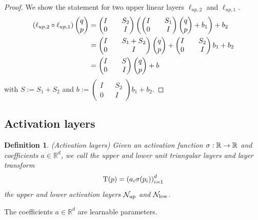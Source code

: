\documentclass[twoside,a4paper]{article}
\newtheorem{definition}{Definition}
\begin{document}
\begin{proof}
	We show the statement for two upper linear layers $\ell_{up,2}$ and $\ell_{up,1}$.
	\begin{align*}
		\left( \ell_{up,2} \circ \ell_{up,1} \right) \begin{pmatrix} q \\ p \end{pmatrix} &=
		\begin{pmatrix}
			I && S_2 \\
			0 && I
		\end{pmatrix}
		\left(
		\begin{pmatrix}
			I && S_1 \\
			0 && I
		\end{pmatrix}
		\begin{pmatrix} q \\ p \end{pmatrix} + b_1
		\right) + b_2 \\
		&= \begin{pmatrix}
			I && S_1 + S_2 \\
			0 && I
		\end{pmatrix} \begin{pmatrix} q \\ p \end{pmatrix}
		+ \begin{pmatrix}
			I && S_2 \\
			0 && I
		\end{pmatrix} b_1
		+ b_2 \\
		&= \begin{pmatrix}
			I && S \\
			0 && I
		\end{pmatrix} \begin{pmatrix} q \\ p \end{pmatrix} + b
	\end{align*}
	with $S := S_1 + S_2$ and $b := \begin{pmatrix}
		I && S_2 \\
		0 && I
	\end{pmatrix} b_1
	+ b_2$.
\end{proof}

\subsection{Activation layers}

\begin{definition}
	(Activation layers)
	Given an activation function $\sigma : \mathbb{R} \to \mathbb{R}$ and coefficients $a \in \mathbb{R}^d$, 
	we call the upper and lower unit triangular layers and layer transform
	\begin{equation*}
		\mathrm{T}(p) = \left( a_i \sigma(p_i) \right)_{i=1}^d
	\end{equation*}
	the upper and lower activation layers $\mathcal{N}_{\text{up}}$ and $\mathcal{N}_{\text{low}}$.
\end{definition}
The coefficients $a \in \mathbb{R}^d$ are learnable parameters.
\end{document}
